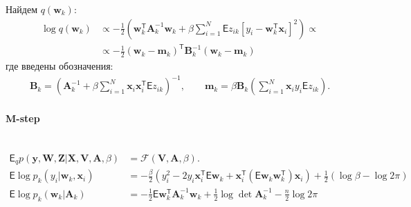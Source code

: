 \documentclass[12pt, twoside]{article}
\numberwithin{equation}{section}
\begin{document}
Найдем $q\left(\textbf{w}_{k}\right)$:
\begin{equation}
\label{eq:st:11}
\begin{aligned}
\log q\left(\textbf{w}_{k}\right) &\propto -\frac{1}{2}\left(\textbf{w}_{k}^{\mathsf{T}}\textbf{A}_{k}^{-1}\textbf{w}_{k} +\beta \sum_{i=1}^{N}\mathsf{E}z_{ik}\left[y_{i} - \textbf{w}_{k}^{\mathsf{T}}\textbf{x}_{i}\right]^{2}\right) \propto\\
&\propto -\frac{1}{2}\left(\textbf{w}_{k} - \textbf{m}_{k}\right)^{\mathsf{T}}\textbf{B}_{k}^{-1}\left(\textbf{w}_{k} - \textbf{m}_{k}\right)
\end{aligned}
\end{equation}
где введены обозначения:
\begin{equation}
\label{eq:st:12}
\begin{aligned}
\textbf{B}_{k} = \left(\textbf{A}_{k}^{-1} + \beta\sum_{i=1}^{N}\textbf{x}_{i}\textbf{x}_{i}^{\mathsf{T}}\mathsf{E}z_{ik}\right)^{-1}, \qquad \textbf{m}_{k} = \beta\textbf{B}_{k}\left(\sum_{i=1}^{N}\textbf{x}_{i}y_{i}\mathsf{E}z_{ik}\right).
\end{aligned}
\end{equation}

\paragraph{M-step}~
\begin{equation}
\label{eq:st:13}
\begin{aligned}
\mathsf{E}_{q} p\left(\textbf{y}, \textbf{W}, \textbf{Z}|\textbf{X}, \textbf{V}, \textbf{A}, \beta\right) &= \mathcal{F}\left(\textbf{V}, \textbf{A}, \beta\right). \\
\mathsf{E}\log p_{k}\left(y_{i}|\textbf{w}_{k}, \textbf{x}_{i}\right) &= -\frac{\beta}{2}\left(y_{i}^{2}-2y_{i}\textbf{x}_{i}^{\mathsf{T}}\mathsf{E}\textbf{w}_{k}+\textbf{x}_{i}^{\mathsf{T}}\left(\mathsf{E}\textbf{w}_{k}\textbf{w}_{k}^{\mathsf{T}}\right)\textbf{x}_{i}\right) + \frac{1}{2}\left(\log\beta - \log2\pi\right)\\
\mathsf{E}\log p_{k}\left(\textbf{w}_{k}|\textbf{A}_{k}\right) &= -\frac{1}{2}\mathsf{E}\textbf{w}_{k}^{\mathsf{T}}\textbf{A}_{k}^{-1}\textbf{w}_{k} + \frac{1}{2}\log\det\textbf{A}_{k}^{-1} - \frac{n}{2}\log2\pi
\end{aligned}
\end{equation}
\end{document}
